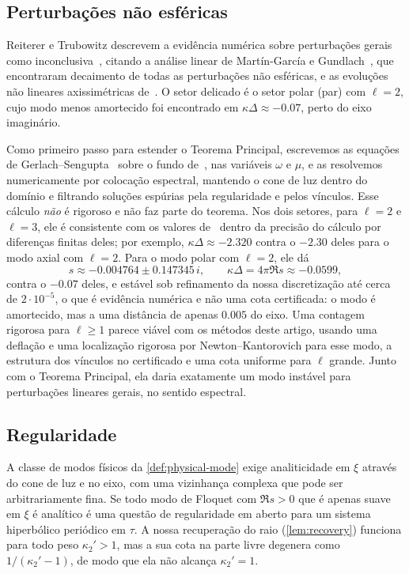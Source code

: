 \subsection{Perturbações não esféricas}

Reiterer e Trubowitz descrevem a evidência numérica sobre perturbações gerais como inconclusiva~\cite{RT2019},
citando a análise linear de Mart\'in-Garc\'ia e Gundlach~\cite{MartinGarciaGundlach1999}, que encontraram decaimento de todas
as perturbações não esféricas, e as evoluções não lineares axissimétricas
de~\cite{ChoptuikHirschmannLieblingPretorius2003}. O setor delicado é o setor polar (par) com $\ell=2$,
cujo modo menos amortecido foi encontrado em $\kappa\Delta\approx-0.07$, perto do eixo imaginário.

Como primeiro passo para estender o Teorema Principal, escrevemos as equações de
Gerlach--Sengupta~\cite{GerlachSengupta1979} sobre o fundo de~\cite{RT2019}, nas variáveis $\omega$ e $\mu$, e
as resolvemos numericamente por colocação espectral, mantendo o cone de luz dentro do domínio e filtrando soluções
espúrias pela regularidade e pelos vínculos. Esse cálculo \emph{não} é rigoroso e não faz parte do
teorema. Nos dois setores, para $\ell=2$ e $\ell=3$, ele é consistente com os valores
de~\cite{MartinGarciaGundlach1999} dentro da precisão do cálculo por diferenças finitas deles; por exemplo,
$\kappa\Delta\approx-2.320$ contra o $-2.30$ deles para o modo axial com $\ell=2$. Para o modo polar com $\ell=2$,
ele dá
\[
  s\approx-0.004764\pm0.147345\,i,\qquad \kappa\Delta=4\pi\Re s\approx-0.0599,
\]
contra o $-0.07$ deles, e estável sob refinamento da nossa discretização até cerca de $2\cdot10^{-5}$, o que é
evidência numérica e não uma cota certificada: o modo é amortecido, mas a uma distância de apenas $0.005$ do
eixo. Uma contagem rigorosa para $\ell\ge1$ parece viável com os métodos deste artigo, usando uma deflação e uma
localização rigorosa por Newton--Kantorovich para esse modo, a estrutura dos vínculos no certificado e uma cota uniforme para
$\ell$ grande. Junto com o Teorema Principal, ela daria exatamente um modo instável para perturbações lineares gerais,
no sentido espectral.

\subsection{Regularidade}\label{sec:discussion-regularity}

A classe de modos físicos da \cref{def:physical-mode} exige analiticidade em $\xi$ através do cone de luz e
no eixo, com uma vizinhança complexa que pode ser arbitrariamente fina. Se todo modo de Floquet com
$\Re s>0$ que é apenas suave em $\xi$ é analítico é uma questão de regularidade em aberto para um sistema hiperbólico
periódico em $\tau$. A nossa recuperação do raio (\cref{lem:recovery}) funciona para todo peso $\kappa_2'>1$, mas a sua cota na
parte livre degenera como $1/(\kappa_2'-1)$, de modo que ela não alcança $\kappa_2'=1$.

